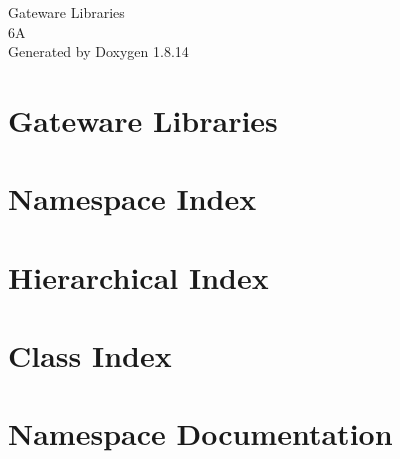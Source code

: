 \documentclass[twoside]{book}
\newcommand{\+}{\discretionary{\mbox{\scriptsize$\hookleftarrow$}}{}{}}
\newcommand{\clearemptydoublepage}{%
  \newpage{\pagestyle{empty}\cleardoublepage}%
}
\begin{document}
\hypersetup{pageanchor=false,
             bookmarksnumbered=true,
             pdfencoding=unicode
            }
\begin{titlepage}
\vspace*{7cm}
\begin{center}%
{\Large Gateware Libraries \\[1ex]\large 6A }\\
\vspace*{1cm}
{\large Generated by Doxygen 1.8.14}\\
\end{center}
\end{titlepage}
\clearemptydoublepage
{}
\tableofcontents
\clearemptydoublepage
{}
\hypersetup{pageanchor=true}

\chapter{Gateware Libraries}
\label{index}\hypertarget{index}{}
\chapter{Namespace Index}

\chapter{Hierarchical Index}

\chapter{Class Index}

\chapter{Namespace Documentation}






\end{document}
